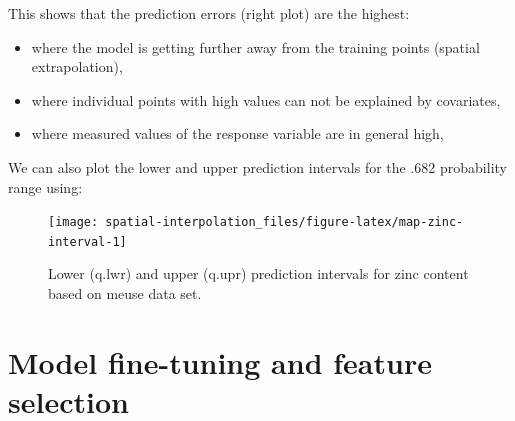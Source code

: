 \documentclass[
  graybox,natbib,nospthms]{svmono}
\newenvironment{Shaded}{\begin{snugshade}}{\end{snugshade}}
\newcommand{\AttributeTok}[1]{\textcolor[rgb]{0.61,0.61,0.61}{#1}}
\newcommand{\DecValTok}[1]{\textcolor[rgb]{0.06,0.06,0.06}{#1}}
\newcommand{\FunctionTok}[1]{\textcolor[rgb]{0,0,0}{#1}}
\newcommand{\NormalTok}[1]{#1}
\newcommand{\OtherTok}[1]{\textcolor[rgb]{0.37,0.37,0.37}{#1}}
\newcommand{\SpecialCharTok}[1]{\textcolor[rgb]{0,0,0}{#1}}
\newcommand{\StringTok}[1]{\textcolor[rgb]{0.5,0.5,0.5}{#1}}
\providecommand{\tightlist}{%
  \setlength{\itemsep}{0pt}\setlength{\parskip}{0pt}}
\providecommand{\tightlist}{\setlength{\itemsep}{0pt}\setlength{\parskip}{0pt}}
\begin{document}
This shows that the prediction errors (right plot) are the highest:

\begin{itemize}
\tightlist
\item
  where the model is getting further away from the training points (spatial extrapolation),\\
\item
  where individual points with high values can not be explained by covariates,\\
\item
  where measured values of the response variable are in general high,
\end{itemize}

We can also plot the lower and upper prediction intervals for the .682
probability range using:

\begin{Shaded}
\end{Shaded}

\begin{figure}

{\centering \texttt{[image: spatial-interpolation\_files/figure-latex/map-zinc-interval-1]} 

}

\caption{Lower (q.lwr) and upper (q.upr) prediction intervals for zinc content based on meuse data set.}\label{fig:map-zinc-interval}
\end{figure}

\hypertarget{model-fine-tuning-and-feature-selection}{%
\section{Model fine-tuning and feature selection}\label{model-fine-tuning-and-feature-selection}}
\end{document}
